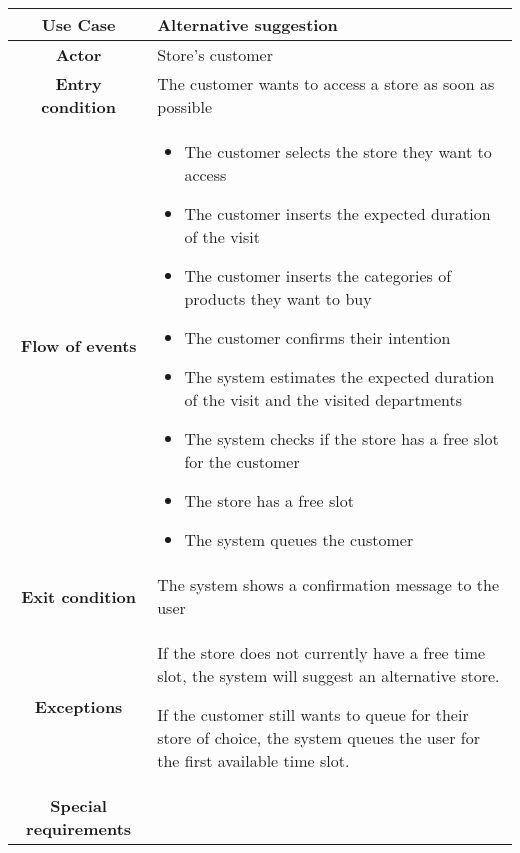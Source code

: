 \documentclass[../../main.tex]{subfiles}
\begin{document}
    \begin{table}[H]
      \centering
        \begin{tabular}{c m{}}
        \hline
        \textbf{Use Case} & Alternative suggestion\\ \hline
        \textbf{Actor} & Store's customer\\ \hline
        \textbf{Entry condition} & The customer wants to access a store as soon as possible\\  \hline
        \textbf{Flow of events} & \begin{itemize}
                                    \item The customer selects the store they want to access
                                    \item The customer inserts the expected duration of the visit
                                    \item The customer inserts the categories of products they want to buy
                                    \item The customer confirms their intention
                                    \item The system estimates the expected duration of the visit and the visited departments
                                    \item The system checks if the store has a free slot for the customer
                                    \item The store has a free slot
                                    \item The system queues the customer
                                  \end{itemize}\\ \hline
        \textbf{Exit condition} & The system shows a confirmation message to the user \\ \hline
        \textbf{Exceptions} &  If the store does not currently have a free time slot, the system will suggest an alternative store.
                                
                               If the customer still wants to queue for their store of choice, the system queues the user for the first available time slot. \\ \hline
        \textbf{Special requirements} &\\ \hline
        \end{tabular}
    \end{table}
\end{document}

